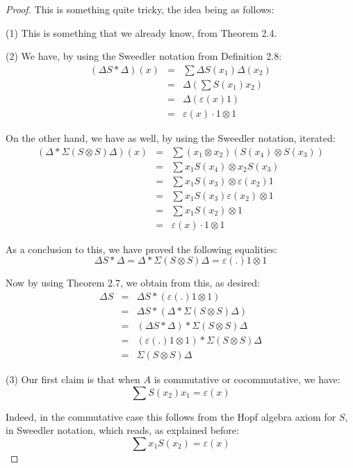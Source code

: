\documentclass[12pt]{amsbook}
\begin{document}
\begin{proof}
This is something quite tricky, the idea being as follows:

\medskip

(1) This is something that we already know, from Theorem 2.4.

\medskip

(2) We have, by using the Sweedler notation from Definition 2.8:
\begin{eqnarray*}
(\Delta S*\Delta)(x)
&=&\sum\Delta S(x_1)\Delta(x_2)\\
&=&\Delta\left(\sum S(x_1)x_2\right)\\
&=&\Delta(\varepsilon(x)1)\\
&=&\varepsilon(x)\cdot1\otimes1
\end{eqnarray*}

On the other hand, we have as well, by using the Sweedler notation, iterated:
\begin{eqnarray*}
(\Delta*\Sigma(S\otimes S)\Delta)(x)
&=&\sum(x_1\otimes x_2)(S(x_4)\otimes S(x_3))\\
&=&\sum x_1S(x_4)\otimes x_2S(x_3)\\
&=&\sum x_1S(x_3)\otimes\varepsilon(x_2)1\\
&=&\sum x_1S(x_3)\varepsilon(x_2)\otimes1\\
&=&\sum x_1S(x_2)\otimes1\\
&=&\varepsilon(x)\cdot1\otimes1
\end{eqnarray*}

As a conclusion to this, we have proved the following equalities:
$$\Delta S*\Delta=\Delta*\Sigma(S\otimes S)\Delta=\varepsilon(.)1\otimes1$$

Now by using Theorem 2.7, we obtain from this, as desired:
\begin{eqnarray*}
\Delta S
&=&\Delta S*(\varepsilon(.)1\otimes1)\\
&=&\Delta S*(\Delta*\Sigma(S\otimes S)\Delta)\\
&=&(\Delta S*\Delta)*\Sigma(S\otimes S)\Delta\\
&=&(\varepsilon(.)1\otimes1)*\Sigma(S\otimes S)\Delta\\
&=&\Sigma(S\otimes S)\Delta
\end{eqnarray*}

(3) Our first claim is that when $A$ is commutative or cocommutative, we have:
$$\sum S(x_2)x_1=\varepsilon(x)$$

Indeed, in the commutative case this follows from the Hopf algebra axiom for $S$, in Sweedler notation, which reads, as explained before:
$$\sum x_1S(x_2)=\varepsilon(x)$$


\end{proof}
\end{document}
